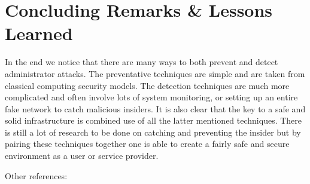 \section{Concluding Remarks \& Lessons Learned}
\label{conclusion}

In the end we notice that there are many ways to both prevent and detect administrator attacks. The preventative techniques are simple and are taken from classical computing security models. The detection techniques are much more complicated and often involve lots of system monitoring, or setting up an entire fake network to catch malicious insiders. It is also clear that the key to a safe and solid infrastructure is combined use of all the latter mentioned techniques. There is still a lot of research to be done on catching and preventing the insider but by pairing these techniques together one is able to create a fairly safe and secure environment as a user or service provider.

{\tiny Other references: \cite{mukherjee}\cite{oltsik}\cite{dimitrios}\cite{magklaras}\cite{bishop}\cite{yun}\cite{chen}\cite{chou}\cite{kamalkant}}
